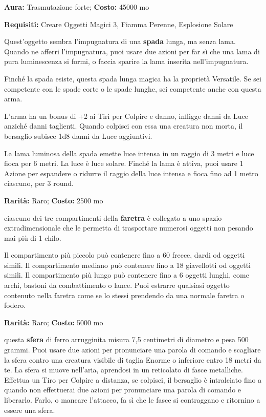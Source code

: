 \begin{multicols}{2}

\textbf{Aura:} Trasmutazione forte; \textbf{Costo:} 45000 mo

\textbf{Requisiti:} Creare Oggetti Magici 3, Fiamma Perenne, Esplosione Solare

Quest'oggetto sembra l'impugnatura di una \textbf{spada} lunga, ma senza lama. Quando ne afferri l'impugnatura, puoi usare due azioni per far sì che una lama di pura luminescenza si formi, o faccia sparire la lama inserita nell'impugnatura.

Finché la spada esiste, questa spada lunga magica ha la proprietà Versatile. Se sei competente con le spade corte o le spade lunghe, sei competente anche con questa arma.

L'arma ha un bonus di +2 ai Tiri per Colpire e danno, infligge danni da Luce anziché danni taglienti. Quando colpisci con essa una creatura non morta, il bersaglio subisce 1d8 danni da Luce aggiuntivi.

La lama luminosa della spada emette luce intensa in un raggio di 3 metri e luce fioca per 6 metri. La luce è luce solare. Finché la lama è attiva, puoi usare 1 Azione per espandere o ridurre il raggio della luce intensa e fioca fino ad 1 metro ciascuno, per 3 round.


\textbf{Rarità:} Raro; \textbf{Costo:} 2500 mo

ciascuno dei tre compartimenti della \textbf{faretra} è collegato a uno spazio extradimensionale che le permetta di trasportare numerosi oggetti non pesando mai più di 1 chilo.

Il compartimento più piccolo può contenere fino a 60 frecce, dardi od oggetti simili. Il compartimento mediano può contenere fino a 18 giavellotti od oggetti simili. Il compartimento più lungo può contenere fino a 6 oggetti lunghi, come archi, bastoni da combattimento o lance. Puoi estrarre qualsiasi oggetto contenuto nella faretra come se lo stessi prendendo da una normale faretra o fodero.


\textbf{Rarità:} Raro; \textbf{Costo:} 5000 mo

questa \textbf{sfera} di ferro arrugginita misura 7,5 centimetri di diametro e pesa 500 grammi. Puoi usare due azioni per pronunciare una parola di comando e scagliare la sfera contro una creatura visibile di taglia Enorme o inferiore entro 18 metri da te. La sfera si muove nell'aria, aprendosi in un reticolato di fasce metalliche. Effettua un Tiro per Colpire a distanza, se colpisci, il bersaglio è intralciato fino a quando non effettuerai due azioni per pronunciare una parola di comando e liberarlo. Farlo, o mancare l'attacco, fa sì che le fasce si contraggano e ritornino a essere una sfera.


\end{multicols}
